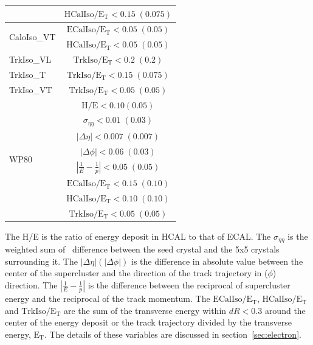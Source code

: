 \begin{table}[htp]
\begin{tabular}{l|c}
                                 & $\mathrm{HCalIso/E_T <0.15\;(0.075)}$ \\
    \hline
    \multirow{2}{*}{CaloIso\_VT} & $\mathrm{ECalIso/E_T <0.05\;(0.05)}$ \\
                                 & $\mathrm{HCalIso/E_T <0.05\;(0.05)}$ \\
    \hline \hline
    TrkIso\_VL                   & $\mathrm{TrkIso/E_T <0.2\;(0.2)}$ \\
    \hline
    TrkIso\_T                   & $\mathrm{TrkIso/E_T <0.15\;(0.075)}$ \\
    \hline
    TrkIso\_VT                   & $\mathrm{TrkIso/E_T <0.05\;(0.05)}$ \\
    \hline \hline
    \multirow{8}{*}{WP80} 		& $\mathrm{H/E < 0.10 (0.05) }$ \\
                               	& $\sigma_{\eta\eta}\mathrm{< 0.01\;(0.03)}$ \\
    							& $|\Delta\eta|\mathrm{< 0.007\; (0.007)}$ \\
                               	& $|\Delta\phi|\mathrm{< 0.06\;(0.03)}$  \\
                               	& $|\frac{1}{E}-\frac{1}{p}|\mathrm{< 0.05\;(0.05)}$  \\
    							& $\mathrm{ECalIso/E_T <0.15\;(0.10)}$ \\
                                & $\mathrm{HCalIso/E_T <0.10\;(0.10)}$ \\
                       			& $\mathrm{TrkIso/E_T <0.05\;(0.05)}$\\
    \hline
 \end{tabular}
\end{table}
The H/E is the ratio of energy deposit in HCAL to that of ECAL. 
The $\sigma_{\eta\eta}$ is the weighted sum of \Eta\ difference between the 
seed crystal and the 5x5 crystals surrounding it.   
The $|\Delta\eta|(|\Delta\phi|)$ is the difference in absolute value between 
the center of the supercluster and the direction of the track trajectory 
in \Eta($\phi$) direction.   
The $|\frac{1}{E}-\frac{1}{p}|$ is the difference between 
the reciprocal of supercluster energy 
and the reciprocal of the track momentum.  
The $\mathrm{ECalIso/E_T}$, $\mathrm{HCalIso/E_T}$ and $\mathrm{TrkIso/E_T}$ 
are the sum of the transverse energy within $dR<0.3$ %
around the center of the energy deposit or the track trajectory
divided by the transverse energy, $\mathrm{E_T}$.
The details of these variables are discussed in section~\ref{sec:electron}.

